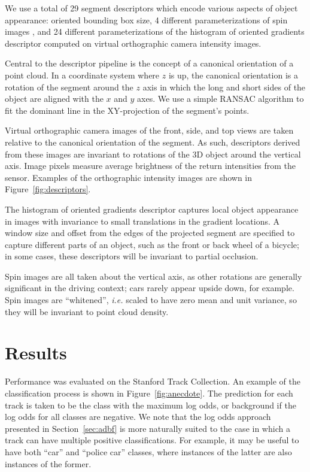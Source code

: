 \documentclass[letterpaper, 10 pt, conference]{ieeeconf}  %
\begin{document}
We use a total of 29 segment descriptors which encode various aspects of object appearance: oriented bounding box size, 4 different parameterizations of spin images \cite{Johnson1999}, and 24 different parameterizations of the histogram of oriented gradients \cite{Dalal2005} descriptor computed on virtual orthographic camera intensity images.

Central to the descriptor pipeline is the concept of a canonical orientation of a point cloud.  In a coordinate system where $z$ is up, the canonical orientation is a rotation of the segment around the $z$ axis in which the long and short sides of the object are aligned with the $x$ and $y$ axes.  We use a simple RANSAC algorithm to fit the dominant line in the XY-projection of the segment's points.

Virtual orthographic camera images of the front, side, and top views are taken relative to the canonical orientation of the segment.  As such, descriptors derived from these images are invariant to rotations of the 3D object around the vertical axis.  Image pixels measure average brightness of the return intensities from the sensor.  Examples of the orthographic intensity images are shown in Figure~\ref{fig:descriptors}.

The histogram of oriented gradients descriptor captures local object appearance in images with invariance to small translations in the gradient locations.  A window size and offset from the edges of the projected segment are specified to capture different parts of an object, such as the front or back wheel of a bicycle; in some cases, these descriptors will be invariant to partial occlusion. 

Spin images are all taken about the vertical axis, as other rotations are generally significant in the driving context; cars rarely appear upside down, for example.  Spin images are ``whitened'', \textit{i.e.} scaled to have zero mean and unit variance, so they will be invariant to point cloud density.

\section{Results}
\label{sec:results}

Performance was evaluated on the Stanford Track Collection.  An example of the classification process is shown in Figure~\ref{fig:anecdote}.  The prediction for each track is taken to be the class with the maximum log odds, or background if the log odds for all classes are negative.  We note that the log odds approach presented in Section~\ref{sec:adbf} is more naturally suited to the case in which a track can have multiple positive classifications.  For example, it may be useful to have both ``car'' and ``police car'' classes, where instances of the latter are also instances of the former.
\end{document}
